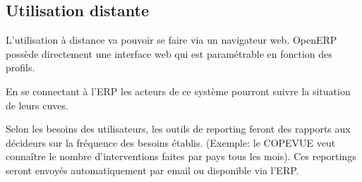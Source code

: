 \subsection{Utilisation distante}

L'utilisation à distance va pouvoir se faire via un navigateur web. OpenERP
possède directement une interface web qui est paramétrable en fonction des
profils.

En se connectant à l'ERP les acteurs de ce système pourront suivre la
situation de leurs cuves.

Selon les besoins des utilisateurs, les outils de reporting feront des
rapports aux décideurs sur la fréquence des besoins établis. (Exemple: le
COPEVUE veut connaître le nombre d'interventions faites par pays tous les
mois). Ces reportings seront envoyés automatiquement par email
ou disponible via l'ERP. 
